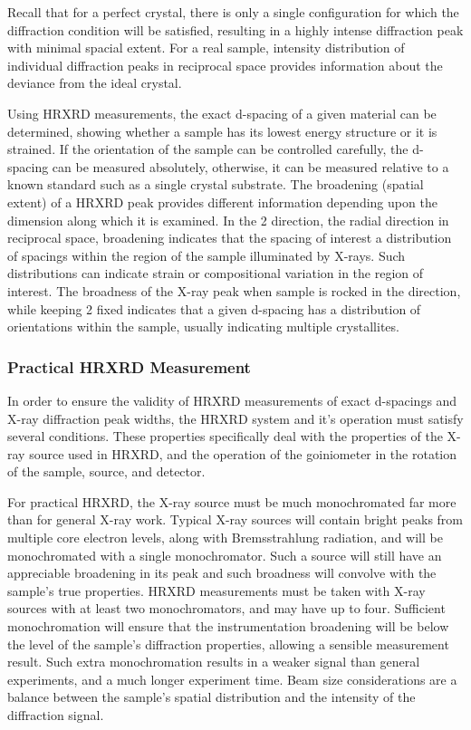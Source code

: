 Recall that for a perfect crystal, there is only a single configuration for which the diffraction condition will be satisfied, resulting in a highly intense diffraction peak with minimal spacial extent.
For a real sample, intensity distribution of individual diffraction peaks in reciprocal space provides information about the deviance from the ideal crystal.

Using HRXRD measurements, the exact d-spacing of a given material can be determined, showing whether a sample has its lowest energy structure or it is strained.
If the orientation of the sample can be controlled carefully, the d-spacing can be measured absolutely, otherwise, it can be measured relative to a known standard such as a single crystal substrate.
The broadening (spatial extent) of a HRXRD peak provides different information depending upon the dimension along which it is examined.
In the 2\straighttheta{} direction, the radial direction in reciprocal space, broadening indicates that the spacing of interest a distribution of spacings within the region of the sample illuminated by X-rays.
Such distributions can indicate strain or compositional variation in the region of interest.
The broadness of the X-ray peak when sample is rocked in the \textomega{} direction, while keeping 2\straighttheta{} fixed indicates that a given d-spacing has a distribution of orientations within the sample, usually indicating multiple crystallites.

\subsubsection{Practical HRXRD Measurement} In order to ensure the validity of HRXRD measurements of exact d-spacings and X-ray diffraction peak widths, the HRXRD system and it's operation must satisfy several conditions.
These properties specifically deal with the properties of the X-ray source used in HRXRD, and the operation of the goiniometer in the rotation of the sample, source, and detector.

For practical HRXRD, the X-ray source must be much monochromated far more than for general X-ray work.
Typical X-ray sources will contain bright peaks from multiple core electron levels, along with Bremsstrahlung radiation, and will be monochromated with a single monochromator.
Such a source will still have an appreciable broadening in its peak and such broadness will convolve with the sample's true properties.
HRXRD measurements must be taken with X-ray sources with at least two monochromators, and may have up to four.
Sufficient monochromation will ensure that the instrumentation broadening will be below the level of the sample's diffraction properties, allowing a sensible measurement result.
Such extra monochromation results in a weaker signal than general experiments, and a much longer experiment time.
Beam size considerations are a balance between the sample's spatial distribution and the intensity of the diffraction signal.

